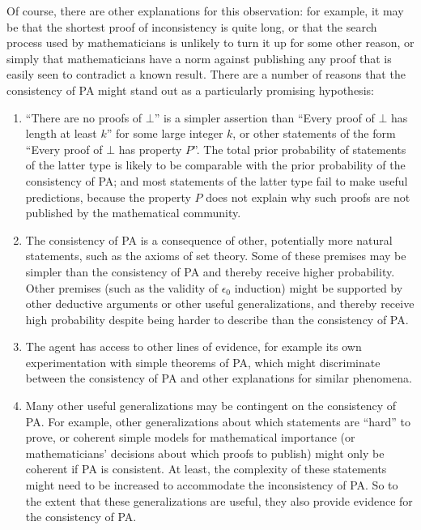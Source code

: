 \documentclass[12pt]{article}
\theoremstyle{definition}
\begin{document}
Of course, there are other explanations for this observation:
for example, it may be that the shortest proof of inconsistency is quite long,
or that the search process used by mathematicians is unlikely to turn it up for some
other reason, or simply that mathematicians have a norm against publishing
any proof that is easily seen to contradict a known result.
There are a number of reasons that the consistency of PA might stand out
as a particularly promising hypothesis:
\begin{enumerate}
\item ``There are no proofs of $\bot$'' is a simpler assertion than
``Every proof of $\bot$ has length at least $k$'' for some large integer $k$,
or other statements of the form ``Every proof of $\bot$ has property $P$''.
The total prior probability of statements of the latter type is likely
to be comparable with the prior probability of the consistency of PA; and most statements
of the latter type fail to make useful predictions,
because the property $P$ does not explain why such proofs
are not published by the mathematical community.
\item The consistency of PA is a consequence of other, potentially more natural statements,
such as the axioms of set theory.
Some of these premises may be simpler than the consistency of PA
and thereby receive higher probability.
Other premises (such as the validity of $\epsilon_0$ induction) 
might be supported by other deductive arguments or other useful generalizations, 
and thereby receive high probability despite being harder to describe than the consistency of PA.
\item The agent has access to other lines of evidence, for example its own experimentation
with simple theorems of PA, which might discriminate between the consistency of PA
and other explanations for similar phenomena.
\item Many other useful generalizations may be contingent on the consistency of PA.
For example, other generalizations about which statements are ``hard'' to prove,
or coherent simple models for mathematical importance (or mathematicians' decisions about
which proofs to publish) might only be coherent if PA is consistent.
At least, the complexity of these statements might need to be increased
to accommodate the inconsistency of PA.
So to the extent that these generalizations are useful, they also provide
evidence for the consistency of PA.
\end{enumerate}
\end{document}
